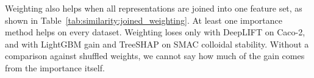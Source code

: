 Weighting also helps when all representations are joined into one feature set, as shown in Table~\ref{tab:similarity:joined_weighting}. At least one importance method helps on every dataset. Weighting loses only with DeepLIFT on Caco-2, and with LightGBM gain and TreeSHAP on SMAC colloidal stability. Without a comparison against shuffled weights, we cannot say how much of the gain comes from the importance itself.

